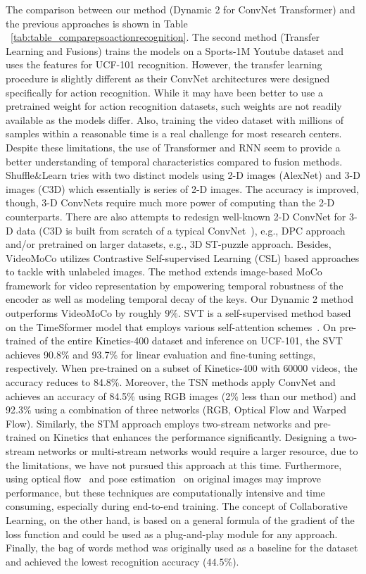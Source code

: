 \documentclass[fleqn,10pt]{wlscirep}
\begin{document}
The comparison between our method (Dynamic 2 for ConvNet Transformer) and the previous approaches is shown in Table ~\ref{tab:table_comparepsoactionrecognition}. The second method (Transfer Learning and Fusions) trains the models on a Sports-1M Youtube dataset and uses the features for UCF-101 recognition. However, the transfer learning procedure is slightly different as their ConvNet architectures were designed specifically for action recognition. While it may have been better to use a pretrained weight for action recognition datasets, such weights are not readily available as the models differ. Also, training the video dataset with millions of samples within a reasonable time is a real challenge for most research centers. Despite these limitations, the use of Transformer and RNN seem to provide a better understanding of temporal characteristics compared to fusion methods. Shuffle\&Learn tries with two distinct models using 2-D images (AlexNet) and 3-D images (C3D) which essentially is series of 2-D images. The accuracy is improved, though, 3-D ConvNets require much more power of computing than the 2-D counterparts. There are also attempts to redesign well-known 2-D ConvNet for 3-D data (C3D is built from scratch of a typical ConvNet~\cite{tran2015learning}), e.g., DPC approach and/or pretrained on larger datasets, e.g., 3D ST-puzzle approach. Besides, VideoMoCo utilizes Contrastive Self-supervised Learning (CSL) based approaches to tackle with unlabeled images. The method extends image-based MoCo framework for video representation by empowering temporal robustness of the encoder as well as modeling temporal decay of the keys. Our Dynamic 2 method outperforms VideoMoCo by roughly $9\%$. SVT is a self-supervised method based on the TimeSformer model that employs various self-attention schemes~\cite{bertasius2021space}. On pre-trained of the entire Kinetics-400 dataset and inference on UCF-101, the SVT achieves 90.8\% and 93.7\% for linear evaluation and fine-tuning settings, respectively. When pre-trained on a subset of Kinetics-400 with $60000$ videos, the accuracy reduces to 84.8\%. Moreover, the TSN methods apply ConvNet and achieves an accuracy of 84.5\% using RGB images (2\% less than our method) and 92.3\% using a combination of three networks (RGB, Optical Flow and Warped Flow). Similarly, the STM approach employs two-stream networks and pre-trained on Kinetics that enhances the performance significantly. Designing a two-stream networks or multi-stream networks would require a larger resource, due to the limitations, we have not pursued this approach at this time. Furthermore, using optical flow~\cite{zhao2022global} and pose estimation~\cite{fang2023alphapose} on original images may improve performance, but these techniques are computationally intensive and time consuming, especially during end-to-end training. The concept of Collaborative Learning, on the other hand, is based on a general formula of the gradient of the loss function and could be used as a plug-and-play module for any approach. Finally, the bag of words method was originally used as a baseline for the dataset and achieved the lowest recognition accuracy ($44.5\%$).
\end{document}
